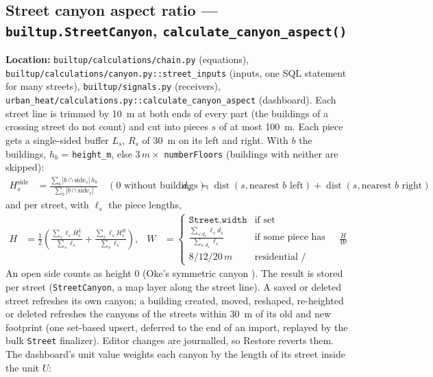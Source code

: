 \documentclass[11pt]{article}
\newcommand{\code}[1]{\texttt{#1}}
\begin{document}
\subsection{Street canyon aspect ratio --- \code{builtup.StreetCanyon}, \code{calculate\_canyon\_aspect()}}
\label{sec:canyon}
\textbf{Location:} \code{builtup/calculations/chain.py} (equations), \code{builtup/calculations/canyon.py::street\_inputs} (inputs, one SQL statement for many streets), \code{builtup/signals.py} (receivers), \code{urban\_heat/calculations.py::calculate\_canyon\_aspect} (dashboard).
Each street line is trimmed by \SI{10}{m} at both ends of every part (the buildings of a crossing street do not count) and cut into pieces $s$ of at most \SI{100}{m}. Each piece gets a single-sided buffer $L_s$, $R_s$ of \SI{30}{m} on its left and right. With $b$ the buildings, $h_b$ = \code{height\_m}, else $3\,\si{m} \times$ \code{numberFloors} (buildings with neither are skipped):
\begin{align}
  H_{s}^{\text{side}} &= \frac{\sum_b |b \cap \text{side}_s|\, h_b}{\sum_b |b \cap \text{side}_s|} \quad (0 \text{ without buildings}), &
  d_s &= \operatorname{dist}(s, \text{nearest } b \text{ left}) + \operatorname{dist}(s, \text{nearest } b \text{ right})
\end{align}
and per street, with $\ell_s$ the piece lengths,
\begin{align}
  H &= \frac{1}{2}\left(\frac{\sum_s \ell_s H_s^{L}}{\sum_s \ell_s} + \frac{\sum_s \ell_s H_s^{R}}{\sum_s \ell_s}\right), &
  W &= \begin{cases} \code{Street.width} & \text{if set} \\ \frac{\sum_{s: d_s} \ell_s d_s}{\sum_{s: d_s} \ell_s} & \text{if some piece has buildings on both sides} \\ 8 / 12 / 20\,\si{m} & \text{residential / secondary / primary} \end{cases}, &
  \frac{H}{W}
\end{align}
An open side counts as height 0 (Oke's symmetric canyon \cite{Oke1987}). The result is stored per street (\code{StreetCanyon}, a map layer along the street line). A saved or deleted street refreshes its own canyon; a building created, moved, reshaped, re-heighted or deleted refreshes the canyons of the streets within \SI{30}{m} of its old and new footprint (one set-based upsert, deferred to the end of an import, replayed by the bulk \code{Street} finalizer). Editor changes are journalled, so Restore reverts them. The dashboard's unit value weights each canyon by the length of its street inside the unit $U$:
\end{document}
